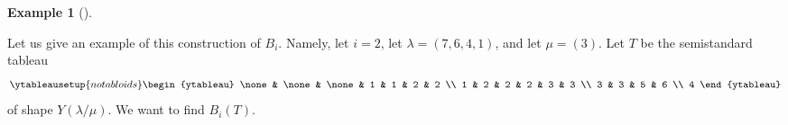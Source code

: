 \documentclass[numbers=enddot,12pt,final,onecolumn,notitlepage]{scrartcl}%
\theoremstyle{definition}
\newtheorem{exmp}[theo]{Example}
\newenvironment{example}[1][]
{\begin{exmp}[#1]\begin{leftbar}}
{\end{leftbar}\end{exmp}}
\begin{document}

\begin{example}
\label{exa.BKclassical}Let us give an example of this construction of $B_{i}$.
Namely, let $i=2$, let $\lambda=\left(  7,6,4,1\right)  $, and let
$\mu=\left(  3\right)  $. Let $T$ be the semistandard tableau%
\[%
\ytableausetup{notabloids}
\begin{ytableau}
\none& \none& \none& 1 & 1 & 2 & 2 \\
1 & 2 & 2 & 2 & 3 & 3 \\
3 & 3 & 5 & 6 \\
4
\end{ytableau}%
\]
of shape $Y\left(  \lambda/\mu\right)  $. We want to find $B_{i}\left(
T\right)  $.


\end{example}
\end{document}
